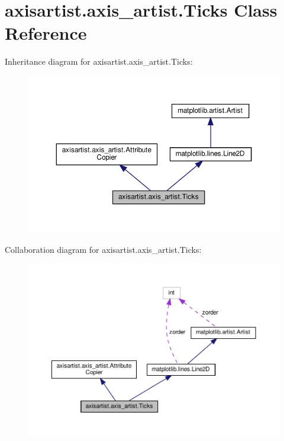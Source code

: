 \hypertarget{classaxisartist_1_1axis__artist_1_1Ticks}{}\section{axisartist.\+axis\+\_\+artist.\+Ticks Class Reference}
\label{classaxisartist_1_1axis__artist_1_1Ticks}


Inheritance diagram for axisartist.\+axis\+\_\+artist.\+Ticks\+:
\nopagebreak
\begin{figure}[H]
\begin{center}
\leavevmode
\includegraphics[width=350pt]{classaxisartist_1_1axis__artist_1_1Ticks__inherit__graph}
\end{center}
\end{figure}


Collaboration diagram for axisartist.\+axis\+\_\+artist.\+Ticks\+:
\nopagebreak
\begin{figure}[H]
\begin{center}
\leavevmode
\includegraphics[width=350pt]{classaxisartist_1_1axis__artist_1_1Ticks__coll__graph}
\end{center}
\end{figure}
